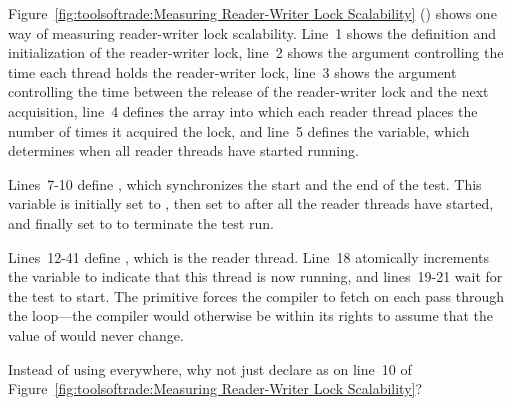 Figure~\ref{fig:toolsoftrade:Measuring Reader-Writer Lock Scalability}
()
shows one way of measuring reader-writer lock scalability.
Line~1 shows the definition and initialization of the reader-writer
lock, line~2 shows the  argument controlling the
time each thread holds the reader-writer lock,
line~3 shows the  argument controlling the time between
the release of the reader-writer lock and the next acquisition,
line~4 defines the  array into which each reader thread
places the number of times it acquired the lock, and
line~5 defines the  variable, which
determines when all reader threads have started running.

Lines~7-10 define , which synchronizes the start and the
end of the test.
This variable is initially set to , then set to
 after all the reader threads have started, and finally
set to  to terminate the test run.

Lines~12-41 define , which is the reader thread.
Line~18 atomically increments the  variable
to indicate that this thread is now running, and
lines~19-21 wait for the test to start.
The  primitive forces the compiler to fetch 
on each pass through the loop---the compiler would otherwise be within its
rights to assume that the value of  would never change.

\QuickQuiz{}
	Instead of using  everywhere, why not just
	declare  as  on line~10 of
	Figure~\ref{fig:toolsoftrade:Measuring Reader-Writer Lock Scalability}?
 \QuickQuizEnd

